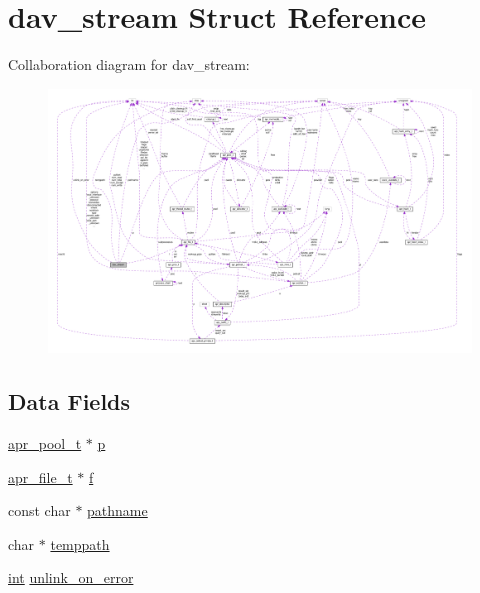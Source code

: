 \hypertarget{structdav__stream}{}\section{dav\+\_\+stream Struct Reference}
\label{structdav__stream}


Collaboration diagram for dav\+\_\+stream\+:
\nopagebreak
\begin{figure}[H]
\begin{center}
\leavevmode
\includegraphics[width=350pt]{structdav__stream__coll__graph}
\end{center}
\end{figure}
\subsection*{Data Fields}
\begin{DoxyCompactItemize}
\item 
\hyperlink{structapr__pool__t}{apr\+\_\+pool\+\_\+t} $\ast$ \hyperlink{structdav__stream_a2cfc6e47f1f7dddc4fea14012efe76b7}{p}
\item 
\hyperlink{structapr__file__t}{apr\+\_\+file\+\_\+t} $\ast$ \hyperlink{structdav__stream_a50a0b7cf28fa2c4206ddfebfa326fb7c}{f}
\item 
const char $\ast$ \hyperlink{structdav__stream_a18d9d8708539e26076a52e71dc9dc0b0}{pathname}
\item 
char $\ast$ \hyperlink{structdav__stream_a0d9b720a6599dc3c2a43bfbba84daa26}{temppath}
\item 
\hyperlink{pcre_8txt_a42dfa4ff673c82d8efe7144098fbc198}{int} \hyperlink{structdav__stream_aa290966dae6b8dadef59fb728ecb418a}{unlink\+\_\+on\+\_\+error}
\end{DoxyCompactItemize}


